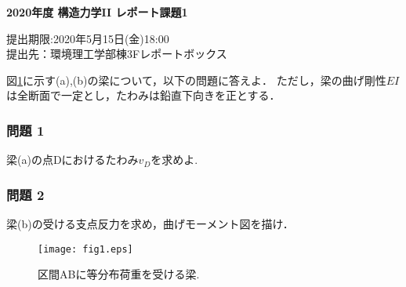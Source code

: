 \documentclass[10pt,a4j]{jarticle}
\newlength{\minitwocolumn}
\begin{document}
\newcommand{\fat}[1]{\mbox{\boldmath $#1$}}
\newcommand{\D}{\partial}
\newcommand{\w}{\omega}
\newcommand{\ga}{\alpha}
\newcommand{\gb}{\beta}
\newcommand{\gx}{\xi}
\newcommand{\gz}{\zeta}
\newcommand{\vhat}[1]{\hat{\fat{#1}}}
\newcommand{\spc}{\vspace{0.7\baselineskip}}
\newcommand{\halfspc}{\vspace{0.3\baselineskip}}

\pagestyle{empty}
\newcommand{\twofig}[2]
 {
   \begin{figure}[here]
     \begin{minipage}[t]{\minitwocolumn}
         \begin{center}   #1
         \end{center}
     \end{minipage}
         \hspace{\columnsep}
     \begin{minipage}[t]{\minitwocolumn}
         \begin{center} #2
         \end{center}
     \end{minipage}
   \end{figure}
 }
\begin{center}
{\Large \bf 2020年度 構造力学II レポート課題1} \\
\end{center}
\begin{flushright}
	提出期限:2020年5月15日(金)18:00\\
	提出先：環境理工学部棟3Fレポートボックス
\end{flushright}
\vspace{15mm}
図\ref{fig:fig1}に示す(a),(b)の梁について，以下の問題に答えよ．
ただし，梁の曲げ剛性$EI$は全断面で一定とし，たわみは鉛直下向きを正とする．
\subsubsection*{問題 1}
梁(a)の点Dにおけるたわみ$v_D$を求めよ.
\subsubsection*{問題 2}
梁(b)の受ける支点反力を求め，曲げモーメント図を描け．
\begin{figure}[h]
	\begin{center}
	\texttt{[image: fig1.eps]} 
	\end{center}
	\caption{区間ABに等分布荷重を受ける梁.} 
	\label{fig:fig1}
\end{figure}
\end{document}
